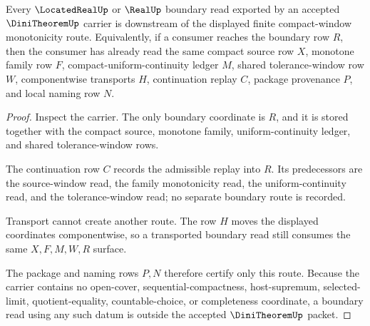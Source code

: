 \begin{theorem}\label{thm:dini-theorem-nonescape-boundary}
Every $\LocatedRealUp$ or $\RealUp$ boundary read exported by an accepted $\DiniTheoremUp$ carrier is downstream of the displayed finite compact-window monotonicity route. Equivalently, if a consumer reaches the boundary row $R$, then the consumer has already read the same compact source row $X$, monotone family row $F$, compact-uniform-continuity ledger $M$, shared tolerance-window row $W$, componentwise transports $H$, continuation replay $C$, package provenance $P$, and local naming row $N$.
\end{theorem}
\begin{proof}
Inspect the carrier. The only boundary coordinate is $R$, and it is stored together with the compact source, monotone family, uniform-continuity ledger, and shared tolerance-window rows.

The continuation row $C$ records the admissible replay into $R$. Its predecessors are the source-window read, the family monotonicity read, the uniform-continuity read, and the tolerance-window read; no separate boundary route is recorded.

Transport cannot create another route. The row $H$ moves the displayed coordinates componentwise, so a transported boundary read still consumes the same $X,F,M,W,R$ surface.

The package and naming rows $P,N$ therefore certify only this route. Because the carrier contains no open-cover, sequential-compactness, host-supremum, selected-limit, quotient-equality, countable-choice, or completeness coordinate, a boundary read using any such datum is outside the accepted $\DiniTheoremUp$ packet.
\end{proof}

\begin{closurestatus}{\DiniTheoremUp}
  \theoryclosure{\seedClosure}
  \formalstatus{\unformalizedV}
\end{closurestatus}
